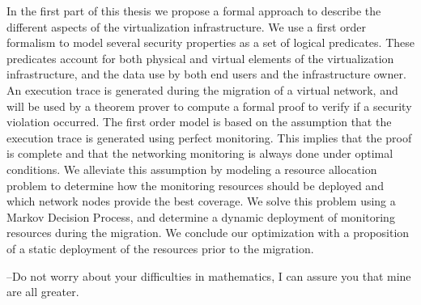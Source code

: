 \documentclass[a4paper, 11pt]{report}
\theoremstyle{definition}
\begin{document}
In the first part of this thesis we propose a formal approach to describe the different aspects of the virtualization infrastructure. We use a first order formalism to model several security properties as a set of logical predicates. These predicates account for both physical and virtual elements of the virtualization infrastructure, and the data use by both end users and the infrastructure owner.
An execution trace is generated during the migration of a virtual network, and will be used by a theorem prover to compute a formal proof to verify if a security violation occurred. The first order model is based on the assumption that the execution trace is generated using perfect monitoring. This implies that the proof is complete and that the networking monitoring is always done under optimal conditions.
We alleviate this assumption by modeling a resource allocation problem to determine how the monitoring resources should be deployed and which network nodes provide the best coverage. We solve this problem using a Markov Decision Process, and determine a dynamic deployment of monitoring resources during the migration. We conclude our optimization with a proposition of a static deployment of the resources prior to the migration.

\setcounter{page}{2}
\begin{savequote}
--Do not worry about your difficulties in mathematics, I can assure you that mine are all greater.
\end{savequote}
\end{document}
